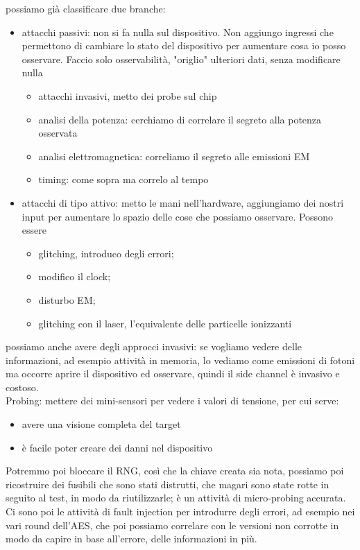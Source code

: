 \documentclass[oneside, 12pt]{extbook}
\begin{document}
possiamo già classificare due branche:
\begin{itemize}
	\item attacchi passivi: non si fa nulla sul dispositivo. Non aggiungo ingressi che permettono di cambiare lo stato del dispositivo per aumentare cosa io posso osservare. Faccio solo osservabilità, "origlio" ulteriori dati, senza modificare nulla
	\begin{itemize}
		\item attacchi invasivi, metto dei probe sul chip
		\item analisi della potenza: cerchiamo di correlare il segreto alla potenza osservata
		\item analisi elettromagnetica: correliamo il segreto alle emissioni EM
		\item timing: come sopra ma correlo al tempo
	\end{itemize}
	\item attacchi di tipo attivo: metto le mani nell'hardware, aggiungiamo dei nostri input per aumentare lo spazio delle cose che possiamo osservare. Possono essere
	\begin{itemize}
		\item glitching, introduco degli errori;
		\item modifico il clock;
		\item disturbo EM;
		\item glitching con il laser, l'equivalente delle particelle ionizzanti
	\end{itemize}
\end{itemize}
possiamo anche avere degli approcci invasivi: se vogliamo vedere delle informazioni, ad esempio attività in memoria, lo vediamo come emissioni di fotoni ma occorre aprire il dispositivo ed osservare, quindi il side channel è invasivo e costoso.\\Probing: mettere dei mini-sensori per vedere i valori di tensione, per cui serve:
\begin{itemize}
	\item avere una visione completa del target
	\item è facile poter creare dei danni nel dispositivo
\end{itemize}
Potremmo poi bloccare il RNG, così che la chiave creata sia nota, possiamo poi ricostruire dei fusibili che sono stati distrutti, che magari sono state rotte in seguito al test, in modo da riutilizzarle; è un attività di micro-probing accurata.\\Ci sono poi le attività di fault injection per introdurre degli errori, ad esempio nei vari round dell'AES, che poi possiamo correlare con le versioni non corrotte in modo da capire in base all'errore, delle informazioni in più.
\end{document}
